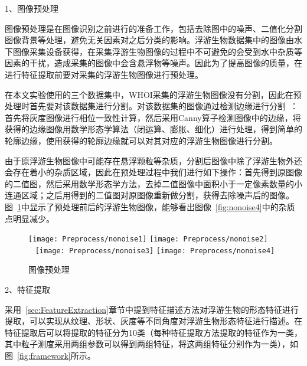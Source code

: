 1、图像预处理

图像预处理是在图像识别之前进行的准备工作，包括去除图中的噪声、二值化分割图像背景等处理，避免无关因素对之后分类的影响。浮游生物数据集中的图像由水下图像采集设备获得，在采集浮游生物图像的过程中不可避免的会受到水中杂质等因素的干扰，造成采集的图像中会含悬浮物等噪声。因此为了提高图像的质量，在进行特征提取前要对采集的浮游生物图像进行预处理。

在本文实验使用的三个数据集中，WHOI采集的浮游生物图像没有分割，因此在预处理时首先要对该数据集进行分割。对该数据集的图像通过检测边缘进行分割~\cite{sosik2007automated}：首先将灰度图像进行相位一致性计算，然后采用Canny算子检测图像中的边缘，将获得的边缘图像用数学形态学算法（闭运算、膨胀、细化）进行处理，得到简单的轮廓边缘，使用获得的轮廓边缘就可以对其对应的浮游生物图像进行分割。

由于原浮游生物图像中可能存在悬浮颗粒等杂质，分割后图像中除了浮游生物外还会存在着小的杂质区域，因此在预处理过程中我们进行如下操作：首先得到原图像的二值图，然后采用数学形态学方法，去掉二值图像中面积小于一定像素数量的小连通区域；之后用得到的二值图对原图像重新做分割，获得去除噪声后的图像。图~\ref{fig:nonoise}中显示了预处理前后的浮游生物图像，能够看出图像~\ref{fig:nonoise4}中的杂质点明显减少。
\begin{figure}[h]
  \centering%
    {\texttt{[image: Preprocess/nonoise1]}}%
  \hspace{2em}%
      {\texttt{[image: Preprocess/nonoise2]}}\\
      ~\newline
      {\texttt{[image: Preprocess/nonoise3]}}
  \hspace{2em}%
      {\texttt{[image: Preprocess/nonoise4]}}
  \caption{图像预处理}
  \label{fig:nonoise}
\end{figure}

2、特征提取

采用~\ref{sec:FeatureExtraction}章节中提到特征描述方法对浮游生物的形态特征进行提取，可以实现从纹理、形状、灰度等不同角度对浮游生物形态特征进行描述。在特征提取后可以将提取的特征分为10类（每种特征提取方法提取的特征作为一类，其中粒子测度采用两组参数可以得到两组特征，将这两组特征分别作为一类），如图~\ref{fig:framework}所示。

